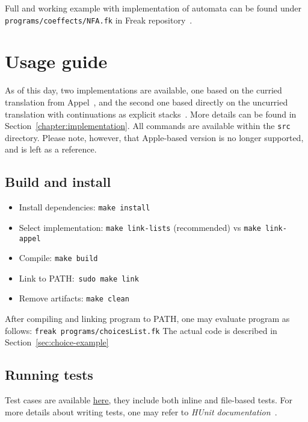 \documentclass[declaration,shortabstract]{iithesis}
\theoremstyle{definition} \newtheorem{definition}{Definition}[chapter]
\theoremstyle{remark} \newtheorem{remark}[definition]{Observation}
\theoremstyle{plain} \newtheorem{theorem}[definition]{Theorem}
\theoremstyle{plain} \newtheorem{lemma}[definition]{Lemma}
\begin{document}
Full and working example with implementation of automata can be found under
\verb!programs/coeffects/NFA.fk! in Freak repository~\cite{freak}.

\section{Usage guide}

    As of this day, two implementations are available, one based on the curried
    translation from Appel~\cite{appel-continuations}, and the second one based
    directly on the uncurried translation with continuations as explicit
    stacks~\cite{handlers-cps-journal}. More details can be found in
    Section~\ref{chapter:implementation}. All commands are available within the
    \verb!src! directory. Please note, however, that Apple-based version is no
    longer supported, and is left as a reference.

    \subsection{Build and install}

    \begin{itemize}
        \item Install dependencies: \verb!make install!
        \item Select implementation: \verb!make link-lists! (recommended) vs \verb!make link-appel!
        \item Compile: \verb!make build!
        \item Link to PATH:~\verb!sudo make link!
        \item Remove artifacts: \verb!make clean!
    \end{itemize}

    After compiling and linking program to PATH, one may evaluate program as
    follows: \verb!freak programs/choicesList.fk! The actual code is described in Section~\ref{sec:choice-example}

    \subsection{Running tests}

    Test cases are available \href{https://github.com/Tomatosoup97/freak/blob/master/src/Tests.hs}{\underline{here}},
    they include both inline and file-based tests. For more details about
    writing tests, one may refer to \textit{HUnit documentation}~\cite{hunit-docs}.
\end{document}

